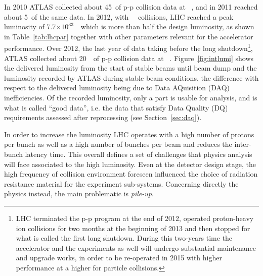 In 2010 ATLAS collected about 45~\ipb of p-p collision data at ~\tev, and in
2011 reached about 5~\ifb of the same data.
In 2012, with  ~\tev\ collisions, LHC reached a peak luminosity of 7.7$\times10^{33}$~\ which is
more than half the design luminosity, as shown in Table~\ref{tab:lhcpar} together
with other parameters relevant for the accelerator performance. 
Over 2012, the last
year of data taking before the long shutdown\footnote{LHC terminated the p-p program
at the end of 2012, operated proton-heavy ion collisions for two months at the beginning
of 2013 and then stopped for what is called the first long shutdown. During this two-years
time the accelerator and the experiments as well will undergo substantial maintenance and 
upgrade works, in order to be re-operated in 2015 with higher performance at a higher
\cme for particle collisions.},
ATLAS collected about 20~\ifb\ of p-p collision data at ~\tev.
Figure~\ref{fig:intlumi} shows the delivered luminosity from the start of stable beams until beam dump and the luminosity recorded by
ATLAS during stable beam conditions, the difference with respect to the delivered luminosity being due to Data AQuisition (DAQ)
inefficiencies. Of the recorded luminosity, only a part is usable for analysis, and is what is called ``good data'', i.e. 
the data that satisfy Data Quality (DQ) requirements assessed after reprocessing (see Section~\ref{sec:daq}).

In order to increase the luminosity LHC operates with a high number of protons per bunch as well as a high
 number of bunches per beam and reduces the inter-bunch latency time.
This overall defines a set of challenges that physics analysis will face associated to the high luminosity.
Even at the detector design stage, the high frequency of collision environment foreseen influenced
the choice of radiation resistance material for the experiment sub-systems. Concerning directly the physics
instead, the main problematic is \textit{pile-up}.

